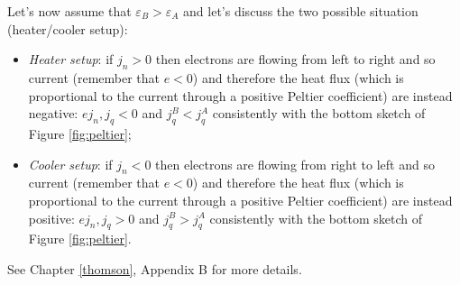 \documentclass[\main/main.tex]{subfiles}
\begin{document}
Let's now assume that $\varepsilon_B>\varepsilon_A$ and let's discuss the two possible situation (heater/cooler setup):
\begin{itemize}
\item \textit{Heater setup}: if $j_n>0$ then electrons are flowing from left to right and so current (remember that $e<0$) and therefore the heat flux (which is proportional to the current through a positive Peltier coefficient) are instead negative: $ej_n,j_q<0$ and $j_q^B<j_q^A$ consistently with the bottom sketch of Figure \ref{fig:peltier};
\item \textit{Cooler setup}: if $j_n<0$ then electrons are flowing from right to left and so current (remember that $e<0$) and therefore the heat flux (which is proportional to the current through a positive Peltier coefficient) are instead positive: $ej_n,j_q>0$ and $j_q^B>j_q^A$ consistently with the bottom sketch of Figure \ref{fig:peltier}.
\end{itemize}

See Chapter \ref{thomson}, Appendix B for more details.
\end{document}
